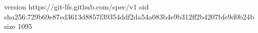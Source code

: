 version https://git-lfs.github.com/spec/v1
oid sha256:729b69e87ed3613d8857f39354ddf2da54a083b4e9b312ff2b4207bfe9d0b24b
size 1095
